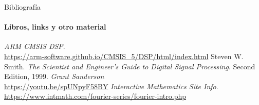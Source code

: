 \begin{frame}{Bibliografía}
   \framesubtitle{Libros, links y otro material}
   \begin{thebibliography}{9}
         \emph{ARM CMSIS DSP}. \\
         \href {https://arm-software.github.io/CMSIS_5/DSP/html/index.html}{https://arm-software.github.io/CMSIS\_5/DSP/html/index.html}
         Steven W. Smith.
         \emph{The Scientist and Engineer's Guide to Digital Signal Processing}.
         Second Edition, 1999.
         \emph{Grant Sanderson} \\
         \href{ https://youtu.be/spUNpyF58BY}{ https://youtu.be/spUNpyF58BY}
         \emph{Interactive Mathematics Site Info}. \\
         \href {https://www.intmath.com/fourier-series/fourier-intro.php}{https://www.intmath.com/fourier-series/fourier-intro.php}
   \end{thebibliography}
\end{frame}

